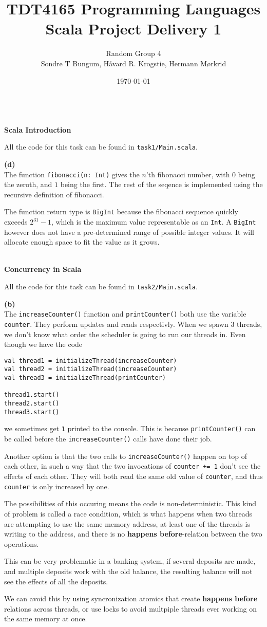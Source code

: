\documentclass[12pt]{article}
\title{TDT4165 Programming Languages\\Scala Project Delivery 1}
\author{\small{Random Group 4}\\ \small{Sondre T Bungum, Håvard R. Krogstie, Hermann Mørkrid}}
\date{\today}
\newcommand{\task}[1]{\vspace*{5mm}\hspace*{-2cm}\fbox{#1}\\[-5mm]}
\newcommand{\subtask}[1]{\hspace*{-1cm}\textbf{(#1)}\\[-5mm]}
\begin{document}
\maketitle

\task{1}
\textbf{Scala Introduction}

All the code for this task can be found in \verb|task1/Main.scala|.

\subtask{d}
The function \verb|fibonacci(n: Int)| gives the $n$'th fibonacci number,
with $0$ being the zeroth, and $1$ being the first. The rest of the seqence
is implemented using the recursive definition of fibonacci.

The function return type is \verb|BigInt| because the fibonacci sequence
quickly exceeds $2^{31}-1$, which is the maximum value representable as an \verb|Int|.
A \verb|BigInt| however does not have a pre-determined range of possible integer values.
It will allocate enough space to fit the value as it grows.

\task{2}
\textbf{Concurrency in Scala}

All the code for this task can be found in \verb|task2/Main.scala|.

\subtask{b}
The \verb|increaseCounter()| function and \verb|printCounter()| both use the variable \verb|counter|.
They perform updates and reads respectivly. When we spawn 3 threads, we don't know what order
the scheduler is going to run our threads in. Even though we have the code
%
\begin{verbatim}
val thread1 = initializeThread(increaseCounter)
val thread2 = initializeThread(increaseCounter)
val thread3 = initializeThread(printCounter)

thread1.start()
thread2.start()
thread3.start()
\end{verbatim}
%
we sometimes get \verb|1| printed to the console. This is because \verb|printCounter()|
can be called before the \verb|increaseCounter()| calls have done their job.

Another option is that the two calls to \verb|increaseCounter()| happen on top of each other,
in such a way that the two invocations of \verb|counter += 1| don't see the effects of each other.
They will both read the same old value of \verb|counter|, and thus \verb|counter| is only increased by one.

The possibilities of this occuring means the code is non-deterministic.
This kind of problem is called a race condition, which is what happens when
two threads are attempting to use the same memory address,
at least one of the threads is writing to the address,
and there is no \textbf{happens before}-relation between the two operations.

This can be very problematic in a banking system, if several deposits are made,
and multiple deposits work with the old balance, the resulting balance will not
see the effects of all the deposits.

We can avoid this by using syncronization atomics that create \textbf{happens before}
relations across threads, or use locks to avoid multpiple threads ever working on the same memory at once.
\end{document}
